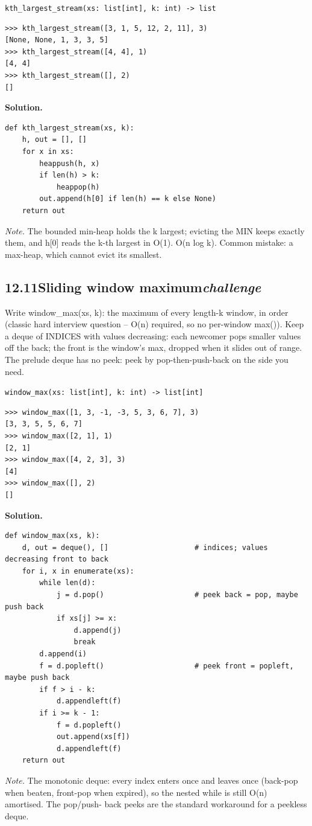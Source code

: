\documentclass[10pt,letterpaper]{book}
\begin{document}
\noindent\texttt{kth\_largest\_stream(xs: list[int], k: int) -> list}
\begin{lstlisting}[style=ex]
>>> kth_largest_stream([3, 1, 5, 12, 2, 11], 3)
[None, None, 1, 3, 3, 5]
>>> kth_largest_stream([4, 4], 1)
[4, 4]
>>> kth_largest_stream([], 2)
[]
\end{lstlisting}
\noindent\textbf{Solution.}
\begin{lstlisting}[style=code]
def kth_largest_stream(xs, k):
    h, out = [], []
    for x in xs:
        heappush(h, x)
        if len(h) > k:
            heappop(h)
        out.append(h[0] if len(h) == k else None)
    return out
\end{lstlisting}
\noindent\textit{Note.} The bounded min-heap holds the k largest; evicting the MIN keeps exactly them, and h[0] reads the k-th largest in O(1). O(n log k). Common mistake: a max-heap, which cannot evict its smallest.

\subsection*{12.11\quad Sliding window maximum\hfill\textnormal{\textit{challenge}}}
Write window\_max(xs, k): the maximum of every length-k window, in order (classic hard interview question -- O(n) required, so no per-window max()). Keep a deque of INDICES with values decreasing: each newcomer pops smaller values off the back; the front is the window's max, dropped when it slides out of range. The prelude deque has no peek: peek by pop-then-push-back on the side you need.

\noindent\texttt{window\_max(xs: list[int], k: int) -> list[int]}
\begin{lstlisting}[style=ex]
>>> window_max([1, 3, -1, -3, 5, 3, 6, 7], 3)
[3, 3, 5, 5, 6, 7]
>>> window_max([2, 1], 1)
[2, 1]
>>> window_max([4, 2, 3], 3)
[4]
>>> window_max([], 2)
[]
\end{lstlisting}
\noindent\textbf{Solution.}
\begin{lstlisting}[style=code]
def window_max(xs, k):
    d, out = deque(), []                    # indices; values decreasing front to back
    for i, x in enumerate(xs):
        while len(d):
            j = d.pop()                     # peek back = pop, maybe push back
            if xs[j] >= x:
                d.append(j)
                break
        d.append(i)
        f = d.popleft()                     # peek front = popleft, maybe push back
        if f > i - k:
            d.appendleft(f)
        if i >= k - 1:
            f = d.popleft()
            out.append(xs[f])
            d.appendleft(f)
    return out
\end{lstlisting}
\noindent\textit{Note.} The monotonic deque: every index enters once and leaves once (back-pop when beaten, front-pop when expired), so the nested while is still O(n) amortised. The pop/push- back peeks are the standard workaround for a peekless deque.
\end{document}
